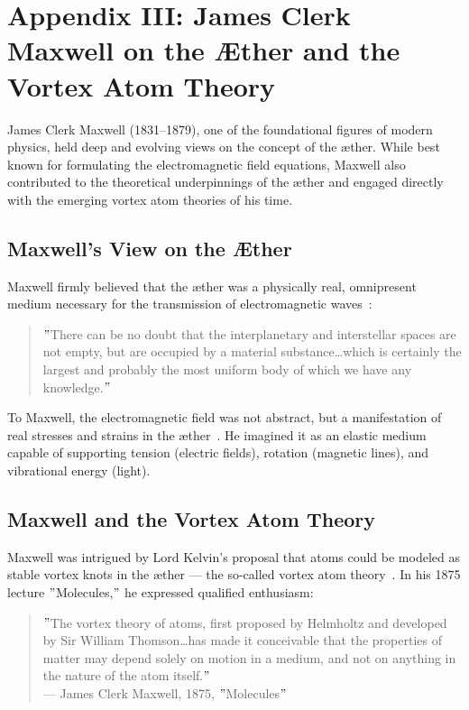\section*{Appendix III: James Clerk Maxwell on the Æther and the Vortex Atom Theory}

James Clerk Maxwell (1831–1879), one of the foundational figures of modern physics, held deep and evolving views on the concept of the æther. While best known for formulating the electromagnetic field equations, Maxwell also contributed to the theoretical underpinnings of the æther and engaged directly with the emerging vortex atom theories of his time.

\subsection*{Maxwell's View on the Æther}
Maxwell firmly believed that the æther was a physically real, omnipresent medium necessary for the transmission of electromagnetic waves~\cite{maxwell1878britannica}:

\begin{quote}
\("\)There can be no doubt that the interplanetary and interstellar spaces are not empty, but are occupied by a material substance\ldots which is certainly the largest and probably the most uniform body of which we have any knowledge.\("\)
\end{quote}

To Maxwell, the electromagnetic field was not abstract, but a manifestation of real stresses and strains in the æther~\cite{maxwell1878britannica}. He imagined it as an elastic medium capable of supporting tension (electric fields), rotation (magnetic lines), and vibrational energy (light).

\subsection*{Maxwell and the Vortex Atom Theory}

Maxwell was intrigued by Lord Kelvin’s proposal that atoms could be modeled as stable vortex knots in the æther — the so-called vortex atom theory~\cite{maxwell1875molecules}. In his 1875 lecture \("\)Molecules,\("\) he expressed qualified enthusiasm:

\begin{quote}
\("\)The vortex theory of atoms, first proposed by Helmholtz and developed by Sir William Thomson\ldots has made it conceivable that the properties of matter may depend solely on motion in a medium, and not on anything in the nature of the atom itself.\("\)
\\— James Clerk Maxwell, 1875, \("\)Molecules\("\)
\end{quote}

